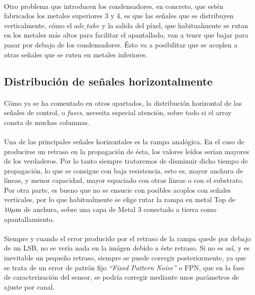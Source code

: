 \paragraph{}
Otro problema que introducen los condensadores, en concreto, que estén fabricados
los metales superiores 3 y 4, es que las señales que se distribuyen verticalmente,
cómo el $adc\_take$ y la salida del píxel, que habitualmente se rutan en los metales
más altos para facilitar el apantallado, van a tener que bajar para pasar por debajo
de los condensadores. Ésto va a posibilitar que se acoplen a otras señales que se ruten
en metales inferiores.

\subsection{Distribución de señales horizontalmente}

\paragraph{}
Cómo ya se ha comentado en otros apartados, la distribución horizontal de las
señales de control, o \textit{fases}, necesita especial atención, sobre todo
si el array consta de muchas columnas.

\paragraph{}
Una de las principales señales horizontales es la rampa analógica. En el caso de
producirse un retraso en la propagación de ésta, los valores leídos serían mayores
de los verdaderos. Por lo tanto siempre trataremos de disminuir dicho tiempo de
propagación, lo que se consigue con baja resistencia, esto es, mayor anchura de
líneas, y menor capacidad, mayor espaciado con otras líneas o con el substrato.
Por otra parte, es bueno que no se ensucie con posibles acoplos con señales verticales,
por lo que habitualmente se elige rutar la rampa en metal Top de $10\mu\text{m}$ de anchura,
sobre una capa de Metal 3 conectado a tierra como apantallamiento.

\paragraph{}
Siempre y cuando el error producido por el retraso de la rampa quede por debajo
de un LSB, no se vería nada en la imágen debido a éste retraso. Si no es así, y es
inevitable un pequeño retraso, siempre se puede corregir posteriormente, ya que
se trata de un error de patrón fijo \textit{``Fixed Pattern Noise''} o FPN, que
en la fase de caracterización del sensor, se podría corregir mediante unos
parámetros de ajuste por canal.

